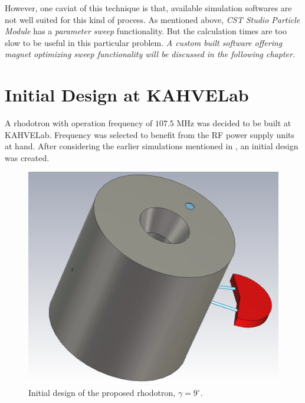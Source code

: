 \documentclass[a4paper,oneside,12pt]{report}
\numberwithin{equation}{chapter}
\begin{document}
However, one caviat of this technique is that, available simulation softwares are not well suited for this kind of process. As mentioned above, \textit{CST Studio Particle Module} has a \textit{parameter sweep} functionality.
But the calculation times are too slow to be useful in this particular problem. \textit{A custom built software offering magnet optimizing sweep functionality will be discussed in the following chapter.}




\section{Initial Design at KAHVELab} 

A rhodotron with operation frequency of $107.5$ MHz was decided to be built at KAHVELab. 
Frequency was selected to benefit from the RF power supply units at hand.
After considering the earlier simulations mentioned in , an initial design was created.
\begin{figure}[H]
    \centering
    \includegraphics[width=.5\linewidth]{./figures/cst/cst_first_design1.png}
    \vspace{20pt}
    \caption{Initial design of the proposed rhodotron, $\gamma=9^\circ$.}
    \label{fig:initial_design}
\end{figure}
\end{document}
